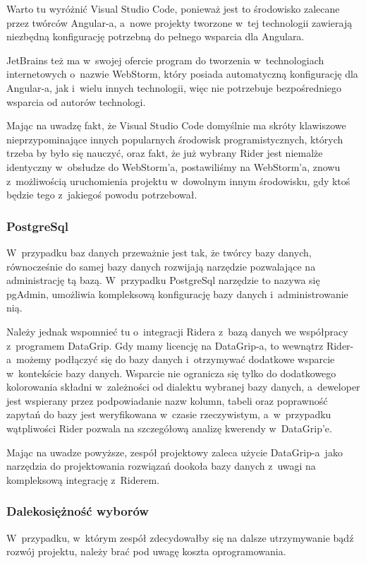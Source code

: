 Warto tu wyróżnić Visual Studio Code, ponieważ jest to środowisko zalecane przez twórców Angular-a, a~nowe projekty tworzone w~tej technologii zawierają niezbędną konfigurację potrzebną do pełnego wsparcia dla Angulara.

JetBrains też ma w~swojej ofercie program do tworzenia w~technologiach internetowych o~nazwie WebStorm, który posiada automatyczną konfigurację dla Angular-a, jak i~wielu innych technologii, więc nie potrzebuje bezpośredniego wsparcia od autorów technologi.

Mając na uwadzę fakt, że Visual Studio Code domyślnie ma skróty klawiszowe nieprzypominające innych popularnych środowisk programistycznych, których trzeba by było się nauczyć, oraz fakt, że już wybrany Rider jest niemalże identyczny w~obsłudze do WebStorm'a, postawiliśmy na WebStorm'a, znowu z~możliwością uruchomienia projektu w~dowolnym innym środowisku, gdy ktoś będzie tego z~jakiegoś powodu potrzebował.

\subsubsection{PostgreSql}
W~przypadku baz danych przeważnie jest tak, że twórcy bazy danych, równocześnie do samej bazy danych rozwijają narzędzie pozwalające na administrację tą bazą.
W~przypadku PostgreSql narzędzie to nazywa się pgAdmin, umożliwia kompleksową konfigurację bazy danych i~administrowanie nią.

Należy jednak wspomnieć tu o~integracji Ridera z~bazą danych we współpracy z~programem DataGrip.
Gdy mamy licencję na DataGrip-a, to wewnątrz Rider-a~możemy podłączyć się do bazy danych i~otrzymywać dodatkowe wsparcie w~kontekście bazy danych.
Wsparcie nie ogranicza się tylko do dodatkowego kolorowania składni w~zależności od dialektu wybranej bazy danych, a~deweloper jest wspierany przez podpowiadanie nazw kolumn, tabeli oraz poprawność zapytań do bazy jest  weryfikowana w~czasie rzeczywistym, a~w~przypadku wątpliwości Rider pozwala na szczegółową analizę kwerendy w~DataGrip'e.

Mając na uwadze powyższe, zespół projektowy zaleca użycie DataGrip-a~jako narzędzia do projektowania rozwiązań dookoła bazy danych z~uwagi na kompleksową integrację z~Riderem.

\subsubsection{Dalekosiężność wyborów}
W~przypadku, w~którym zespół zdecydowałby się na dalsze utrzymywanie bądź rozwój projektu, należy brać pod uwagę koszta oprogramowania.

